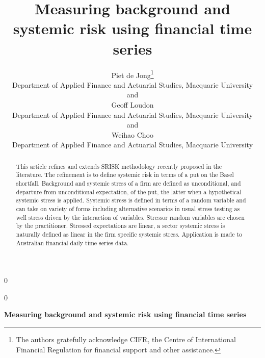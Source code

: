 \documentclass[12pt]{article}
\newcommand{\blind}{0}
\begin{document}
%

\def\spacingset#1{\renewcommand{\baselinestretch}%
{#1}\small\normalsize} \spacingset{1}



\blind
{
  \title{\bf Measuring background and systemic risk using financial time series}
  \author{Piet de Jong\thanks{
    The authors gratefully acknowledge CIFR, the Centre of International Financial Regulation for financial support and other assistance.}\hspace{.2cm}\\
    Department of Applied Finance and Actuarial Studies, Macquarie University\\
    and \\
    Geoff Loudon\\
    Department of Applied Finance and Actuarial Studies, Macquarie University\\
    and\\
    Weihao Choo\\
    Department of Applied Finance and Actuarial Studies, Macquarie University}
  \maketitle
} \fi

\blind
{
  \bigskip
  \bigskip
  \bigskip
  \begin{center}
    {\LARGE\bf Measuring background and systemic risk using financial time series}
\end{center}
  \medskip
} \fi

\bigskip
\begin{abstract}
This article refines and extends  SRISK methodology recently proposed in the literature.  The refinement is to define systemic risk in terms of a put on the Basel shortfall.  Background and systemic stress  of a firm are defined as unconditional, and departure from unconditional  expectation, of the put, the latter when a hypothetical systemic stress is applied.  Systemic stress is defined in terms of a random variable and can take on variety of forms including alternative scenarios in usual stress testing as well stress driven by the interaction of variables.  Stressor random variables  are chosen by the practitioner.  Stressed expectations are linear, a sector systemic stress is naturally defined as linear in the firm specific systemic stress.      Application is made to Australian financial daily time series data.
\end{abstract}
\end{document}
